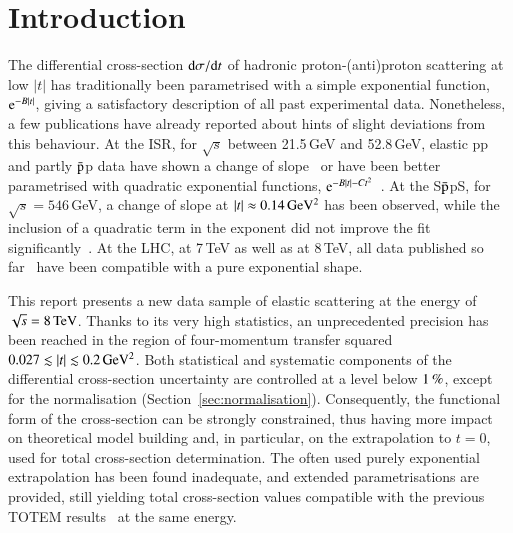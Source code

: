\section{Introduction}
%
The differential cross-section ${\rm d} \sigma/{\rm d} t$ of hadronic proton-(anti)proton 
scattering at low $|t|$ has traditionally been parametrised with a simple 
exponential function, ${\rm e}^{-B |t|}$, giving a satisfactory description of 
all past experimental data.
Nonetheless, a few publications have already reported about hints of
slight deviations from this behaviour. At the ISR, for $\sqrt{s}$ 
between 21.5\,GeV and 52.8\,GeV, elastic pp and partly $\rm\bar{p}$p data have shown a 
change of slope~\cite{plb39,plb115} or have been better parametrised with quadratic 
exponential functions, ${\rm e}^{-B |t|-C t^2}$~\cite{npb141,npb248}. 
At the S$\rm\bar{p}$pS, for 
$\sqrt{s} = 546\,$GeV, a change of slope at $|t| \approx 0.14\,\rm GeV^{2}$ 
has been observed, while the inclusion of a quadratic term in the exponent did
not improve the fit significantly~\cite{plb147}.
At the LHC, at 7\,TeV as well as at 8\,TeV, all data published so 
far~\cite{epl96,epl101-el,prl111,alfa} have been
compatible with a pure exponential shape.

This report presents a new data sample of elastic scattering at the energy of $\sqrt s = 8\,{\rm TeV}$. Thanks to its very high statistics,
an unprecedented precision has been reached in the region of four-momentum transfer squared $0.027 \lesssim |t| \lesssim 0.2\,{\rm GeV^2}$. Both statistical and systematic components of the differential cross-section uncertainty are controlled 
at a level below $1\,{\rm \%}$, except for the normalisation 
(Section~\ref{sec:normalisation}). Consequently, the functional form of the cross-section can be strongly constrained, thus having more impact on theoretical model building and, in particular, on the extrapolation to $t=0$, used for total cross-section determination. The often used purely exponential extrapolation has been found inadequate, and extended parametrisations are provided, still yielding total cross-section values compatible with the previous TOTEM results~\cite{prl111} at the same energy.
